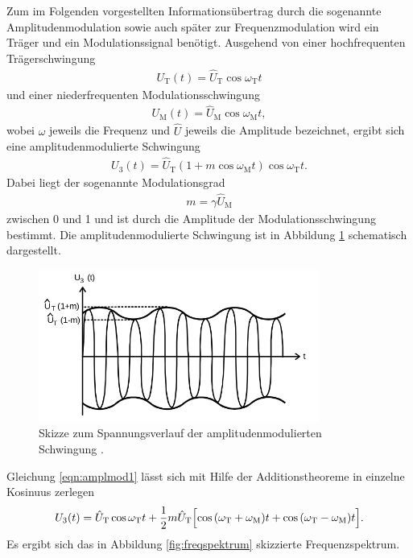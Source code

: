Zum im Folgenden vorgestellten Informationsübertrag durch die sogenannte Amplitudenmodulation sowie auch später zur Frequenzmodulation
wird ein Träger und ein Modulationssignal benötigt. Ausgehend von einer hochfrequenten Trägerschwingung
\begin{align}
  U_{\text{T}}(t) = \hat{U}_{\text{T}} \cos{\omega_{\text{T}} t}
  \label{eqn:traegersch}
\end{align}
und einer niederfrequenten Modulationsschwingung
\begin{align}
  U_{\text{M}}(t) = \hat{U}_{\text{M}} \cos{\omega_{\text{M}} t},
  \label{eqn:modulsch}
\end{align}
wobei $\omega$ jeweils die Frequenz und $\hat{U}$ jeweils die Amplitude bezeichnet,
ergibt sich eine amplitudenmodulierte Schwingung
\begin{align}
  U_3 (t) = \hat{U}_{\text{T}} \left( 1 + m \cos{\omega_{\text{M}} t} \right) \cos{\omega_{\text{T}} t}.
  \label{eqn:amplmod1}
\end{align}
Dabei liegt der sogenannte Modulationsgrad
\begin{align}
  m = \gamma \hat{U}_\text{M}
\end{align}
zwischen 0 und 1 und ist durch die Amplitude der Modulationsschwingung bestimmt.
Die amplitudenmodulierte Schwingung ist in Abbildung \ref{fig:amplmodskizze}
schematisch dargestellt.

\begin{figure}
  \centering
  \includegraphics[height=5cm]{JasperErsterSchultag/amplmodskizze.png}
  \caption{Skizze zum Spannungsverlauf der amplitudenmodulierten Schwingung \cite{anleitung}.}
  \label{fig:amplmodskizze}
\end{figure}

Gleichung \eqref{eqn:amplmod1} lässt sich mit Hilfe der Additionstheoreme in einzelne
Kosinuus zerlegen
\begin{align}
  U_3(t) = \hat{U}_\text{T} \cos{\omega_\text{T} t} + \frac12 m \hat{U}_\text{T} \Bigl[ \cos{(\omega_\text{T}+\omega_\text{M}) t} + \cos{(\omega_\text{T}-\omega_\text{M}) t} \Bigr].
\end{align}
Es ergibt sich das in Abbildung \ref{fig:freqspektrum} skizzierte Frequenzspektrum.

